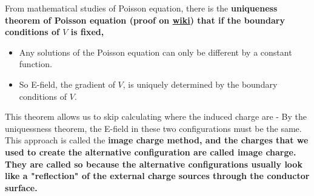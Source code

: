 \documentclass[class=article, crop=false, 12pt]{standalone}
\begin{document}
From mathematical studies of Poisson equation,
there is the \bf{uniqueness theorem of Poisson equation} 
(proof on \href{https://en.wikipedia.org/wiki/Uniqueness_theorem_for_Poisson%27s_equation}{wiki}) 
that if the boundary conditions of $V$ is fixed, 
\begin{itemize}
    \item Any solutions of the Poisson equation can only be different by a constant function. 
    \item So E-field, the gradient of $V$, is uniquely determined by the boundary conditions of $V$.
\end{itemize}

This theorem allows us to skip calculating where the induced charge are - 
By the uniquessness theorem, 
the E-field in these two configurations must be the same.\\

This approach is called the \bf{image charge method},
and the charges that we used to create the alternative configuration are called
\bf{image charge}.
They are called so because the alternative configurations usually look like
a "reflection" of the external charge sources through the conductor surface.
\end{document}
